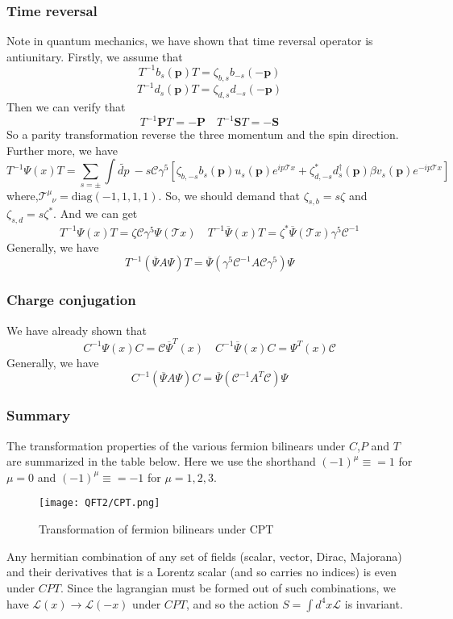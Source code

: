 \documentclass[cyan]{elegantnote}
\begin{document}
\subsubsection{Time reversal}
Note in quantum mechanics, we have shown that time reversal operator is antiunitary. Firstly, we assume that
\[T^{-1} b_s(\bm{p}) T = \zeta_{b,s} b_{-s}(-\bm{p})\]
\[T^{-1} d_s(\bm{p}) T = \zeta_{d,s} d_{-s}(-\bm{p})\]
Then we can verify that
\[T^{-1} \bm{P} T = -\bm{P} \quad T^{-1} \bm{S} T = - \bm{S}\]
So a parity transformation reverse the three momentum and the spin direction. Further more, we have
\[T^{-1}\Psi(x)T = \sum_{s=\pm} \int \widetilde{dp} \: -s \mathcal{C} \gamma^5 \left [ \zeta_{b,-s} b_s(\bm{p}) u_s(\bm{p})e^{ip\mathcal{T}x} + \zeta_{d,-s}^* d^{\dagger}_s(\bm{p}) \beta v_s(\bm{p})e^{-ip\mathcal{T}x} \right ]\]
where,$\mathcal{T}^{\mu}_{\phantom{\mu}\nu} = \mathrm{diag}(-1,1,1,1)$. So, we should demand that $\zeta_{s,b} = s \zeta$ and $\zeta_{s,d} = s \zeta^*$. And we can get
\[T^{-1}\Psi(x)T = \zeta \mathcal{C} \gamma^5 \Psi(\mathcal{T}x) \quad T^{-1}\overline{\Psi}(x)T = \zeta^*  \overline{\Psi}(\mathcal{T}x)\gamma^5 \mathcal{C}^{-1} \]
Generally, we have
\[T^{-1} (\overline{\Psi} A \Psi) T = \overline{\Psi}(\gamma^5 \mathcal{C}^{-1} A \mathcal{C} \gamma^5)\Psi\]

\subsubsection{Charge conjugation}
\noindent
We have already shown that
\[C^{-1}\Psi(x)C = \mathcal{C} \overline{\Psi}^T(x) \quad C^{-1}\overline{\Psi}(x)C = \Psi^T(x)\mathcal{C}\]
Generally, we have
\[C^{-1}(\overline{\Psi} A \Psi )C = \overline{\Psi} (\mathcal{C}^{-1} A^T \mathcal{C})\Psi\]

\subsubsection{Summary}
The transformation properties of the various fermion bilinears under $C$,$P$ and $T$ are summarized in the table below. Here we use the shorthand $(-1)^{\mu} \equiv = 1$ for $\mu =0$ and $(-1)^{\mu} \equiv = -1$ for $\mu=1,2,3$.

\begin{figure}[!h]
\centering
\texttt{[image: QFT2/CPT.png]}
\caption{Transformation of fermion bilinears under CPT}
\end{figure}

\begin{newthem}
Any hermitian combination of any set of fields (scalar, vector, Dirac, Majorana) and their derivatives that is a Lorentz scalar (and so carries no indices) is even under $CPT$. Since the lagrangian must be formed out of such combinations, we
have $\mathcal{L}(x) \to \mathcal{L}(-x)$ under $CPT$, and so the action $S = \int d^4x \mathcal{L}$ is invariant.
\end{newthem}
\end{document}
